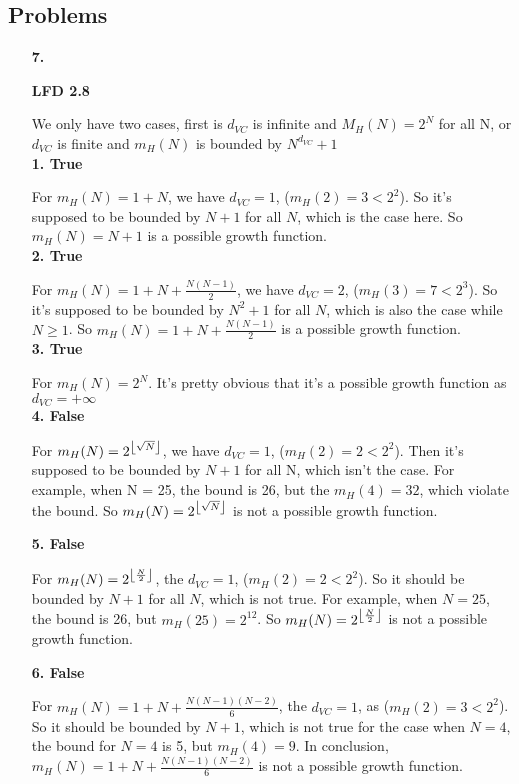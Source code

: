 \documentclass[11pt]{article}
\newcommand{\floor}[1]{\ensuremath \left\lfloor #1 \right\rfloor}
\begin{document}
\subsection*{Problems}
\begin{enumerate}

\item[\textbf{7.}]

\textbf{LFD 2.8}

We only have two cases, first is $d_{VC}$ is infinite and $M_H(N) = 2^N$ for all N, or $d_{VC}$ is finite and $m_H(N)$ is bounded by $N^{d_{VC}} + 1$\\

\textbf{1. True}

For $m_H(N)  = 1+N$, we have $d_{VC} = 1$, ($m_H(2) = 3 < 2^2$). So it's supposed to be bounded by $N+1$ for all $N$, which is the case here. So $m_H(N)=N+1$ is a possible growth function.\\

\textbf{2. True}

For $m_H(N) = 1 + N + \frac{N(N-1)}{2}$, we have $d_{VC} = 2$, ($m_H(3) = 7 < 2^3$). So it's supposed to be bounded by $N^2+1$ for all $N$, which is also the case while $N \geq 1$. So $m_H(N) = 1 + N + \frac{N(N-1)}{2}$ is a possible growth function.\\

\textbf{3. True}

For $m_H(N) = 2^N$. It's pretty obvious that it's a possible growth function as $d_{VC}=+\infty$\\

\textbf{4. False}

For $m_H(N) = 2^{\floor{\sqrt{N}}}$, we have $d_{VC} = 1$, ($m_H(2) = 2 < 2^2$). Then it's supposed to be bounded by $N+1$ for all N, which isn't the case. For example, when N = 25, the bound is 26, but the $m_H(4) = 32$, which violate the bound. So $m_H(N) = 2^{\floor{\sqrt{N}}}$ is not a possible growth function.

\textbf{5. False}

For $m_H(N) = 2^{\floor{{\frac{N}{2}}}}$, the $d_{VC} = 1$, ($m_H(2) = 2 < 2^2$). So it should be bounded by $N+1$ for all $N$, which is not true. For example, when $N=25$, the bound is 26, but $m_H(25) = 2^{12}$. So $m_H(N) = 2^{\floor{\frac{N}{2}}}$ is not a possible growth function. 

\textbf{6. False}

For $m_H(N) = 1+N+\frac{N(N-1)(N-2)}{6}$, the $d_{VC} = 1$, as ($m_H(2) = 3 < 2^2$). So it should be bounded by $N+1$, which is not true for the case when $N = 4$, the bound for $N=4$ is 5, but $m_H(4) = 9$. In conclusion, $m_H(N) = 1 + N + \frac{N(N-1)(N-2)}{6}$ is not a possible growth function.


\end{enumerate}
\end{document}
